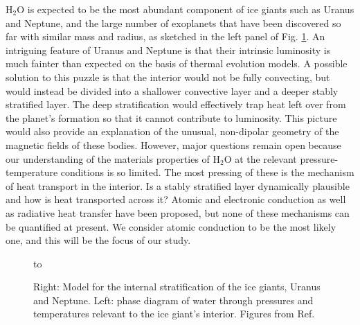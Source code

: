 H$_2$O is expected to be the most abundant component of ice giants such as Uranus and Neptune, and the large number of exoplanets that have been discovered so far with similar mass and radius, as sketched in the left panel of Fig. \ref{fig:Uranus-Neptune}. An intriguing feature of Uranus and Neptune is that their intrinsic luminosity is much fainter than expected on the basis of thermal evolution models. A possible solution to this puzzle is that the interior would not be fully convecting, but would instead be divided into a shallower convective layer and a deeper stably stratified layer.\cite{Hubbard:1995} The deep stratification would effectively trap heat left over from the planet’s formation so that it cannot contribute to luminosity. This picture would also provide an explanation of the unusual, non-dipolar geometry of the magnetic fields of these bodies.\cite{Stanley2006} However, major questions remain open because our understanding of the materials properties of H$_2$O at the relevant pressure-temperature conditions is so limited. The most pressing of these is the mechanism of heat transport in the interior. Is a stably stratified layer dynamically plausible and how is heat transported across it? Atomic and electronic conduction as well as radiative heat transfer have been proposed, but none of these mechanisms can be quantified at present. We consider atomic conduction to be the most likely one, and this will be the focus of our study. 

\begin{figure}
\hbox to 
\caption{Right: Model for the internal stratification of the ice giants, Uranus and Neptune. Left: phase diagram of water through pressures and temperatures relevant to the ice giant's interior. Figures from Ref. }
\label{fig:Uranus-Neptune}
\end{figure}

